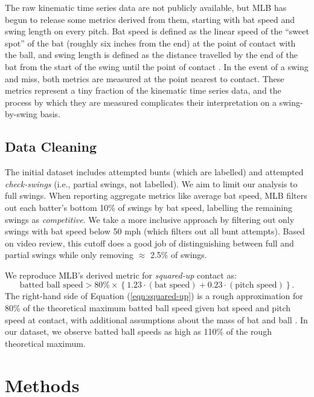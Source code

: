 \documentclass{article}
\begin{document}
      The raw kinematic time series data are not publicly available, but MLB has begun to release some metrics derived from them, starting with bat speed and swing length on every pitch. Bat speed is defined as the linear speed of the ``sweet spot'' of the bat (roughly six inches from the end) at the point of contact with the ball, and swing length is defined as the distance travelled by the end of the bat from the start of the swing until the point of contact \citep{petriello_everything_2024}. In the event of a swing and miss, both metrics are measured at the point nearest to contact. These metrics represent a tiny fraction of the kinematic time series data, and the process by which they are measured complicates their interpretation on a swing-by-swing basis.

    \subsection{Data Cleaning}

    The initial dataset includes attempted bunts (which are labelled) and attempted {\it check-swings} (i.e., partial swings, not labelled). We aim to limit our analysis to full swings. When reporting aggregate metrics like average bat speed, MLB filters out each batter's bottom 10\% of swings by bat speed, labelling the remaining swings as {\it competitive}. We take a more inclusive approach by filtering out only swings with bat speed below 50 mph (which filters out all bunt attempts). Based on video review, this cutoff does a good job of distinguishing between full and partial swings while only removing $\approx$ 2.5\% of swings.

    We reproduce MLB's derived metric for {\it squared-up} contact as:
    \begin{equation}
        \label{eqn:squared-up}
    \mbox{batted ball speed} > 80\% \times \left\{1.23 \cdot (\mbox{bat speed}) + 0.23 \cdot (\mbox{pitch speed})\right\}.
    \end{equation}
    The right-hand side of Equation (\ref{eqn:squared-up}) is a rough approximation for 80\% of the theoretical maximum batted ball speed given bat speed and pitch speed at contact, with additional assumptions about the mass of bat and ball \citep{nathan_dynamics_2000}. In our dataset, we observe batted ball speeds as high as 110\% of the rough theoretical maximum.

  \section{Methods}
  \label{sec:methods}
\end{document}

